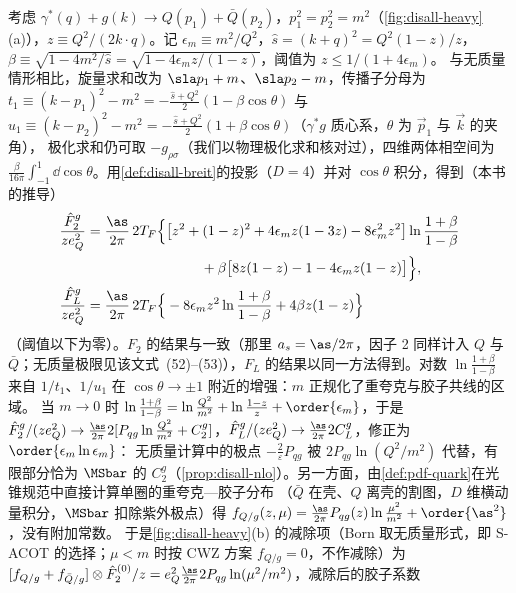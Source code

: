 \begin{example}\label{ex:disall-heavy-lo}
考虑 $\gamma^*(q)+g(k)\to Q(p_1)+\bar Q(p_2)$，$p_1^2=p_2^2=m^2$（\cref{fig:disall-heavy}(a)），$z\equiv Q^2/(2k\cdot q)$。记 $\epsilon_m\equiv m^2/Q^2$，$\hat s=(k+q)^2=Q^2(1-z)/z$，$\beta\equiv\sqrt{1-4m^2/\hat s}=\sqrt{1-4\epsilon_mz/(1-z)}$，阈值为 $z\le1/(1+4\epsilon_m)$。
与无质量情形相比，旋量求和改为 $\sla p_1+m$、$\sla p_2-m$，传播子分母为 $t_1\equiv(k-p_1)^2-m^2=-\frac{\hat s+Q^2}2(1-\beta\cos\theta)$ 与 $u_1\equiv(k-p_2)^2-m^2=-\frac{\hat s+Q^2}2(1+\beta\cos\theta)$（$\gamma^*g$ 质心系，$\theta$ 为 $\vec p_1$ 与 $\vec k$ 的夹角），
极化求和仍可取 $-g_{\rho\sigma}$（我们以物理极化求和核对过），四维两体相空间为 $\frac\beta{16\pi}\int_{-1}^1\dd\cos\theta$。用\cref{def:disall-breit}的投影（$D=4$）并对 $\cos\theta$ 积分，得到（本书的推导）
\begin{equation}\label{eq:disall-heavy-lo}
\begin{aligned}
\frac{\hat F^g_2}{ze_Q^2}&=\frac{\as}{2\pi}\,2T_F\Big\{\big[z^2+(1-z)^2+4\epsilon_mz(1-3z)-8\epsilon_m^2z^2\big]\ln\frac{1+\beta}{1-\beta}\\
&\hspace{8.2em}+\beta\big[8z(1-z)-1-4\epsilon_mz(1-z)\big]\Big\},\\
\frac{\hat F^g_L}{ze_Q^2}&=\frac{\as}{2\pi}\,2T_F\Big\{-8\epsilon_mz^2\ln\frac{1+\beta}{1-\beta}+4\beta z(1-z)\Big\}
\end{aligned}
\end{equation}
（阈值以下为零）。$F_2$ 的结果与\cite[式~(49)--(51)]{Forte:2010ta}一致（那里 $a_s=\as/2\pi$，因子 2 同样计入 $Q$ 与 $\bar Q$；无质量极限见该文式~(52)--(53)），$F_L$ 的结果以同一方法得到。对数 $\ln\frac{1+\beta}{1-\beta}$ 来自 $1/t_1$、$1/u_1$ 在 $\cos\theta\to\pm1$ 附近的增强：$m$ 正规化了重夸克与胶子共线的区域。
当 $m\to0$ 时 $\ln\frac{1+\beta}{1-\beta}=\ln\frac{Q^2}{m^2}+\ln\frac{1-z}z+\order{\epsilon_m}$，于是
$\hat F^g_2/(ze_Q^2)\to\frac{\as}{2\pi}2[P_{qg}\ln\frac{Q^2}{m^2}+C_2^g]$，$\hat F^g_L/(ze_Q^2)\to\frac{\as}{2\pi}2C_L^g$，修正为 $\order{\epsilon_m\ln\epsilon_m}$：
无质量计算中的极点 $-\frac2\varepsilon P_{qg}$ 被 $2P_{qg}\ln(Q^2/m^2)$ 代替，有限部分恰为 $\MSbar$ 的 $C_2^g$（\cref{prop:disall-nlo}）。另一方面，由\cref{def:pdf-quark}在光锥规范中直接计算单圈的重夸克—胶子分布
（$\bar Q$ 在壳、$Q$ 离壳的割图，$D$ 维横动量积分，$\MSbar$ 扣除紫外极点）得 $f_{Q/g}(z,\mu)=\frac{\as}{2\pi}P_{qg}(z)\ln\frac{\mu^2}{m^2}+\order{\as^2}$，没有附加常数。
于是\cref{fig:disall-heavy}(b) 的减除项（Born 取无质量形式，即 S-ACOT 的选择\cite{Kramer:2000hn}；$\mu<m$ 时按 CWZ 方案 $f_{Q/g}=0$，不作减除）为 $[f_{Q/g}+f_{\bar Q/g}]\otimes\hat F^{(0)}_2/z=e_Q^2\frac{\as}{2\pi}2P_{qg}\ln(\mu^2/m^2)$，减除后的胶子系数

\end{example}
